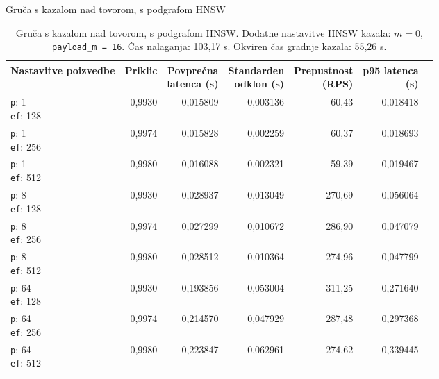 \begin{table}[htbp]
  \centering
\small
  \caption{Gruča s kazalom nad tovorom, s podgrafom HNSW}
  \label{tab:cluster-2cpu-4ram:payload-subgraph:qdrant-dipl-baseline-payload-subgraph-m-16-ef-128-random-768-100-tenants-extended-upload-2026-08-17-20-37-52.json}
  \begin{tabularx}{\textwidth}{Xrrrrrr}
    \toprule
    Nastavitve poizvedbe & Priklic & \makecell{Povprečna\\latenca (s)} & \makecell{Standarden\\odklon (s)} & \makecell{Prepustnost\\(RPS)} & \makecell{p95 latenca\\(s)}  \\
    \midrule
    \makecell{\texttt{p}: 1\\\texttt{ef}: 128} & 0,9930 & 0,015809 & 0,003136 & 60,43 & 0,018418 \\
    \makecell{\texttt{p}: 1\\\texttt{ef}: 256} & 0,9974 & 0,015828 & 0,002259 & 60,37 & 0,018693 \\
    \makecell{\texttt{p}: 1\\\texttt{ef}: 512} & 0,9980 & 0,016088 & 0,002321 & 59,39 & 0,019467 \\
    \makecell{\texttt{p}: 8\\\texttt{ef}: 128} & 0,9930 & 0,028937 & 0,013049 & 270,69 & 0,056064 \\
    \makecell{\texttt{p}: 8\\\texttt{ef}: 256} & 0,9974 & 0,027299 & 0,010672 & 286,90 & 0,047079 \\
    \makecell{\texttt{p}: 8\\\texttt{ef}: 512} & 0,9980 & 0,028512 & 0,010364 & 274,96 & 0,047799 \\
    \makecell{\texttt{p}: 64\\\texttt{ef}: 128} & 0,9930 & 0,193856 & 0,053004 & 311,25 & 0,271640 \\
    \makecell{\texttt{p}: 64\\\texttt{ef}: 256} & 0,9974 & 0,214570 & 0,047929 & 287,48 & 0,297368 \\
    \makecell{\texttt{p}: 64\\\texttt{ef}: 512} & 0,9980 & 0,223847 & 0,062961 & 274,62 & 0,339445 \\
    \bottomrule
  \end{tabularx}
\caption* {Gruča s kazalom nad tovorom, s podgrafom HNSW. Dodatne nastavitve HNSW kazala: $m = 0$, \texttt{payload\_m = 16}. Čas nalaganja: 103,17 s. Okviren čas gradnje kazala: 55,26 s.}\end{table}

